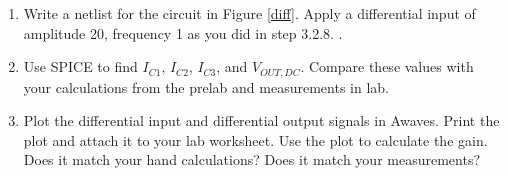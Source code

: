 \documentclass{article}
\begin{document}
\begin{enumerate}
  \item Write a netlist for the circuit in Figure \ref{diff}. Apply a differential input of amplitude \unit{20}{\milli\volt}, frequency \unit{1}{\kilo\hertz} as you did in step 3.2.8. .
  \item Use SPICE to find $I_{C1}$, $I_{C2}$, $I_{C3}$, and $V_{OUT,DC}$. Compare these values with your calculations from the prelab and measurements in lab.
  \item Plot the differential input and differential output signals in Awaves. Print the plot and attach it to your lab worksheet. Use the plot to calculate the gain. Does it match your hand calculations? Does it match your measurements?
\end{enumerate}
\end{document}
